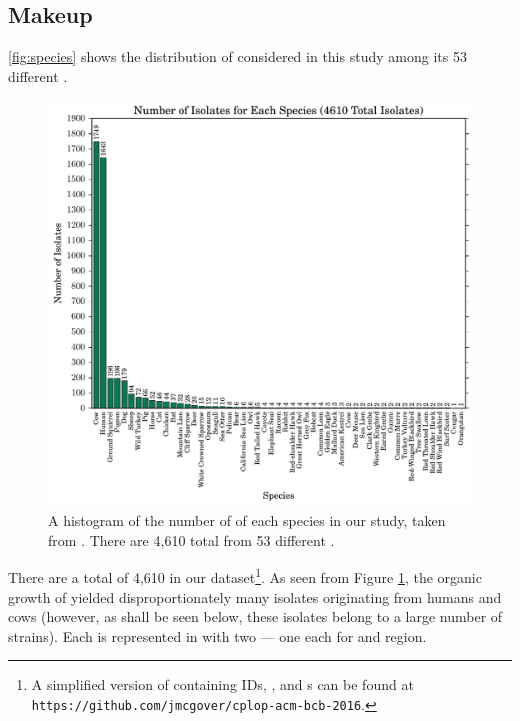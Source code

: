\subsection{\cplop{} Makeup}
\autoref{fig:species} shows the distribution of \cplop{} \isols{} considered in this study among its 53 different \spec{}.
\begin{figure}[t]
    \centering
    \includegraphics[width=\linewidth]{figures/bs/species_hist.pdf}
    \caption{
    A histogram of the number of \isols{} of each species in our study, taken from \cplop{}.
    There are 4,610 total \isols{} from 53 different \specs{}.}
    \label{fig:species}
\end{figure}

There are a total of 4,610 \isols{} in our dataset\footnote{A simplified version of \cplop{} containing \isol{} IDs, \spec{}, and \zscore{}s can be found at \texttt{https://github.com/jmcgover/cplop-acm-bcb-2016}.}. As seen from Figure \ref{fig:species},
the organic growth of \cplop{} yielded disproportionately many \ecoli{} isolates originating
from humans and cows (however, as shall be seen below, these isolates belong to a large number of strains). Each \isol{} is represented in \cplop{} with two \pyros{} ---  one each for  and  
region.